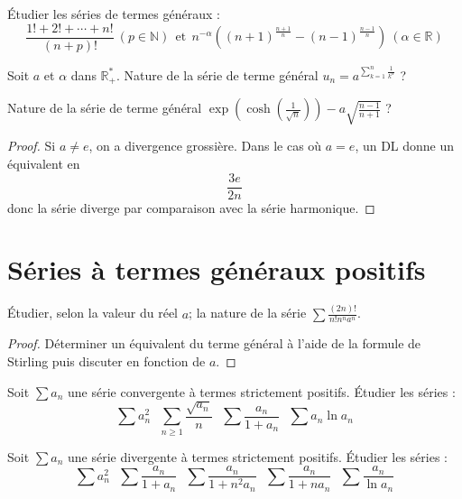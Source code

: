 \documentclass[french,a4paper]{article}
\newcommand{\N}{\mathbb{N}}
\newcommand{\R}{\mathbb{R}}
\newcommand{\st}{^*}
\theoremstyle{plain}
\theoremstyle{definition}
\theoremstyle{remark}
\begin{document}
\begin{ex}[Moulin.08]{}
	Étudier les séries de termes généraux : $$\frac{1!+2!+\cdots+n!}{(n+p)!}\ (p\in\N)\ \ \text{et}\ \ n^{-\alpha}\left((n+1)^{\frac{n+1}{n}}-(n-1)^{\frac{n-1}{n}}\right)\ (\alpha\in\R)$$
\end{ex}

\begin{ex}[Moulin.09]{}
	Soit $a$ et $\alpha$ dans $\R_+\st$. Nature de la série de terme général $u_n=\displaystyle a^{\sum_{k=1}^{n}\frac{1}{k^\alpha}}$ ?
\end{ex}

\begin{ex}[Moulin.10]{}
	Nature de la série de terme général $\displaystyle\exp\left(\cosh\left(\frac{1}{\sqrt{n}}\right)\right)-a\sqrt{\frac{n-1}{n+1}}$ ?
\end{ex}
\begin{proof}
	Si $a\ne e$, on a divergence grossière. Dans le cas où $a=e$, un DL donne un équivalent en $$\frac{3e}{2n}$$ donc la série diverge par comparaison avec la série harmonique.
\end{proof}

\section{Séries à termes généraux positifs}

\begin{ex}[Moulin.11]{}
	Étudier, selon la valeur du réel $a$; la nature de la série $\displaystyle\sum\frac{(2n)!}{n!n^na^n}$.
\end{ex}
\begin{proof}
	Déterminer un équivalent du terme général à l'aide de la formule de Stirling puis discuter en fonction de $a$.
\end{proof}

\begin{ex}[Moulin.12]{}
	Soit $\sum a_n$ une série convergente à termes strictement positifs. Étudier les séries :
	$$\sum a_n^2\ \ \ \sum_{n\geqslant 1}\frac{\sqrt{a_n}}{n}\ \ \ \sum\frac{a_n}{1+a_n}\ \ \ \sum a_n\ln a_n$$
\end{ex}

\begin{ex}[Moulin.13]{}
	Soit $\sum a_n$ une série divergente à termes strictement positifs. Étudier les séries :
	$$\sum a_n^2\ \ \ \sum\frac{a_n}{1+a_n}\ \ \ \sum\frac{a_n}{1+n^2a_n}\ \ \ \sum \frac{a_n}{1+na_n}\ \ \ \sum\frac{a_n}{\ln a_n}$$
\end{ex}
\end{document}

